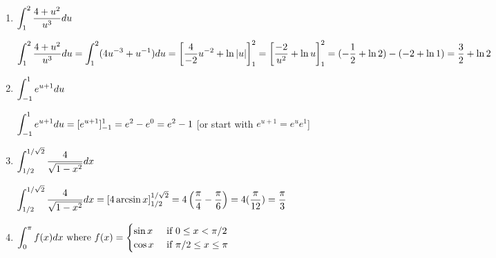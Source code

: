\begin{enumerate}[1.]
\begin{Solution}
\end{Solution}

\item \begin{Question}
    
  $\displaystyle \int_1^2 \frac{4 + u^2}{u^3} du$
\end{Question}

\begin{Solution}
  $\displaystyle \int_1^2 \frac{4 + u^2}{u^3} du =
    \int_1^2 (4u^{-3} + u^{-1}) du =
    \left[ \frac{4}{-2} u^{-2} + \ln |u| \right]_1^2 =
    \left[ \frac{-2}{u^2} + \ln u \right]_1^2 =
    (-\frac{1}{2} + \ln 2) - (-2 + \ln 1) = 
    \frac{3}{2} + \ln 2$
\end{Solution}

\item \begin{Question}
    
  $\displaystyle \int_{-1}^1 e^{u + 1} du$
\end{Question}

\begin{Solution}
  $\displaystyle \int_{-1}^1 e^{u + 1} du = 
    [e^{u + 1}]_{-1}^1 =
    e^2 - e^0 = e^2 - 1$ [or start with $e^{u + 1} = e^u e^1$]
\end{Solution}

\item \begin{Question}
    
  $\displaystyle \int_{1 / 2}^{1 / \sqrt{2}} \frac{4}{\sqrt{1 - x^2}} dx$
\end{Question}

\begin{Solution}
  $\displaystyle \int_{1/2}^{1 / \sqrt{2}} \frac{4}{\sqrt{1 - x^2}} dx =
    \left[ 4 \arcsin x \right]_{1/2}^{1 / \sqrt{2}} =
    4 \left( \frac{\pi}{4} - \frac{\pi}{6} \right) =
    4(\frac{\pi}{12}) = \frac{\pi}{3}$
\end{Solution}

\item \begin{Question}
    
$\displaystyle    \int_0^{\pi} f(x) dx \text{ where } f(x) = 
    \begin{cases}
      \sin x  & \text{ if } 0 \leq x < \pi / 2 \\
      \cos x  & \text{ if } \pi / 2 \leq x \leq \pi \\
    \end{cases}
   $ 

\end{Question}


\end{enumerate}
